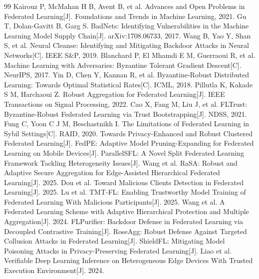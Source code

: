 \documentclass[11pt, a4paper, UTF8, fontset=fandol]{ctexart}
\begin{document}
\begin{thebibliography}{99}
     Kairouz P, McMahan H B, Avent B, et al. Advances and Open Problems in Federated Learning[J]. Foundations and Trends in Machine Learning, 2021.
     Gu T, Dolan-Gavitt B, Garg S. BadNets: Identifying Vulnerabilities in the Machine Learning Model Supply Chain[J]. arXiv:1708.06733, 2017.
     Wang B, Yao Y, Shan S, et al. Neural Cleanse: Identifying and Mitigating Backdoor Attacks in Neural Networks[C]. IEEE S\&P, 2019.
     Blanchard P, El Mhamdi E M, Guerraoui R, et al. Machine Learning with Adversaries: Byzantine Tolerant Gradient Descent[C]. NeurIPS, 2017.
     Yin D, Chen Y, Kannan R, et al. Byzantine-Robust Distributed Learning: Towards Optimal Statistical Rates[C]. ICML, 2018.
     Pillutla K, Kakade S M, Harchaoui Z. Robust Aggregation for Federated Learning[J]. IEEE Transactions on Signal Processing, 2022.
     Cao X, Fang M, Liu J, et al. FLTrust: Byzantine-Robust Federated Learning via Trust Bootstrapping[J]. NDSS, 2021.
     Fung C, Yoon C J M, Beschastnikh I. The Limitations of Federated Learning in Sybil Settings[C]. RAID, 2020.
     Towards Privacy-Enhanced and Robust Clustered Federated Learning[J]. 
     FedPE: Adaptive Model Pruning-Expanding for Federated Learning on Mobile Devices[J]. 
 ParallelSFL: A Novel Split Federated Learning Framework Tackling Heterogeneity Issues[J]. 
     Wang et al. RaSA: Robust and Adaptive Secure Aggregation for Edge-Assisted Hierarchical Federated Learning[J]. 2025.
     Dou et al. Toward Malicious Clients Detection in Federated Learning[J]. 2025.
     Lu et al. TMT-FL: Enabling Trustworthy Model Training of Federated Learning With Malicious Participants[J]. 2025.
     Wang et al. A Federated Learning Scheme with Adaptive Hierarchical Protection and Multiple Aggregation[J]. 2024.
     FLPurifier: Backdoor Defense in Federated Learning via Decoupled Contrastive Training[J]. 
     RoseAgg: Robust Defense Against Targeted Collusion Attacks in Federated Learning[J]. 
     ShieldFL: Mitigating Model Poisoning Attacks in Privacy-Preserving Federated Learning[J]. 
     Liao et al. Verifiable Deep Learning Inference on Heterogeneous Edge Devices With Trusted Execution Environment[J]. 2024.

\end{thebibliography}
\end{document}
